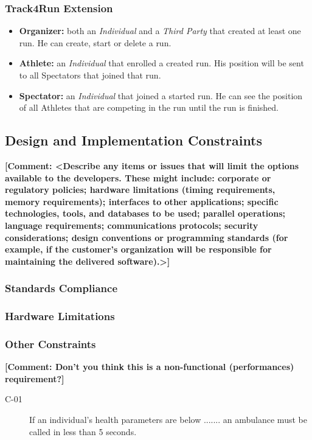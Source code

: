 \documentclass[a4paper]{article}
\newcommand{\comment}[1]{\textbf{[Comment: #1]}}
\begin{document}
        \subsubsection{Track4Run Extension}
        \begin{itemize}
            \item \textbf{Organizer:} both an \textit{Individual} and a \textit{Third Party} that created at least one run. He can create, start or delete a run.
            \item \textbf{Athlete:} an \textit{Individual} that enrolled a created run. His position will be sent to all Spectators that joined that run.
            \item \textbf{Spectator:} an \textit{Individual} that joined a started run. He can see the position of all Athletes that are competing in the run until the run is finished.
        \end{itemize}
        
    \subsection{Design and Implementation Constraints}
    \comment{<Describe any items or issues that will limit the options available to the developers. These might include: corporate or regulatory policies; hardware limitations (timing requirements, memory requirements); interfaces to other applications; specific technologies, tools, and databases to be used; parallel operations; language requirements; communications protocols; security considerations; design conventions or programming standards (for example, if the customer’s organization will be responsible for maintaining the delivered software).>}
    
        \subsubsection{Standards Compliance}
        
        \subsubsection{Hardware Limitations}
        
        \subsubsection{Other Constraints}
        
    \comment{Don't you think this is a non-functional (performances) requirement?}
    \begin{description}
        \item[C-01] If an individual's health parameters are below ....... an ambulance must be called in less than 5 seconds.
    \end{description}
    
\end{document}
